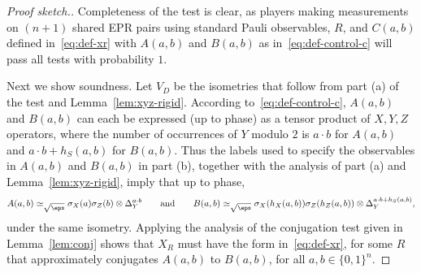 \begin{proof}[Proof sketch.]
 Completeness of the test is clear, as players making measurements on $(n+1)$ shared EPR pairs using standard Pauli observables, $R$, and $C(a,b)$ defined in~\eqref{eq:def-xr} with $A(a,b)$ and $B(a,b)$ as in~\eqref{eq:def-control-c} will pass all tests with probability $1$. 

Next we show soundness. Let $V_D$ be the isometries that follow from part (a) of the test and Lemma~\ref{lem:xyz-rigid}.
According to~\eqref{eq:def-control-c}, $A(a,b)$ and $B(a,b)$ can each be expressed (up to phase) as a tensor product of $X,Y,Z$ operators, where the number of occurrences of $Y$ modulo $2$ is $a\cdot b$ for $A(a,b)$ and $a\cdot b + h_S(a,b)$ for $B(a,b)$. Thus the labels used to specify the observables in $A(a,b)$ and $B(a,b)$ in part (b), together with the analysis of part (a) and Lemma~\ref{lem:xyz-rigid}, imply that up to phase, 
$$A(a,b) \simeq_{\sqrt{\eps}} \sigma_X(a)\sigma_Z(b) \otimes \Delta_Y^{a\cdot b}\qquad\text{and}\qquad B(a,b) \simeq_{\sqrt{\eps}} \sigma_X(h_X(a,b)) \sigma_Z(h_Z(a,b)) \otimes \Delta_Y^{a\cdot b + h_S(a,b)},$$
under the same isometry. 
Applying the analysis of the conjugation test given in Lemma~\ref{lem:conj} shows that $X_R$ must have the form in~\eqref{eq:def-xr}, for some $R$ that approximately conjugates $A(a,b)$ to $B(a,b)$, for all $a,b\in\{0,1\}^n$.


\end{proof}
